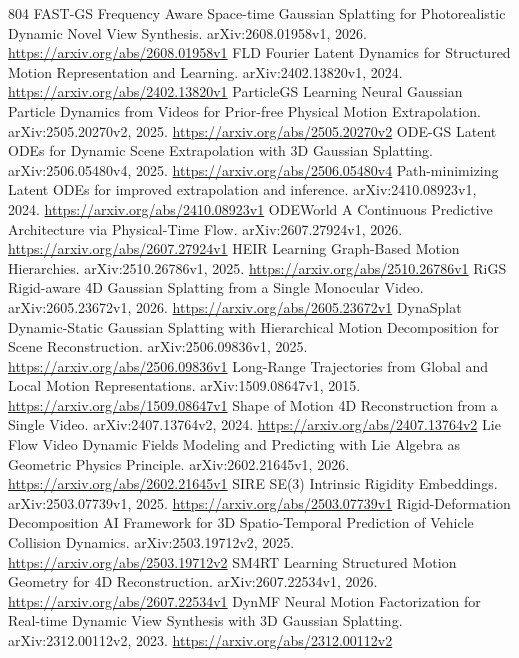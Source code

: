 \documentclass[11pt]{article}
\begin{document}
\begin{thebibliography}{804}
 FAST-GS Frequency Aware Space-time Gaussian Splatting for Photorealistic Dynamic Novel View Synthesis. arXiv:2608.01958v1, 2026. \url{https://arxiv.org/abs/2608.01958v1}
 FLD Fourier Latent Dynamics for Structured Motion Representation and Learning. arXiv:2402.13820v1, 2024. \url{https://arxiv.org/abs/2402.13820v1}
 ParticleGS Learning Neural Gaussian Particle Dynamics from Videos for Prior-free Physical Motion Extrapolation. arXiv:2505.20270v2, 2025. \url{https://arxiv.org/abs/2505.20270v2}
 ODE-GS Latent ODEs for Dynamic Scene Extrapolation with 3D Gaussian Splatting. arXiv:2506.05480v4, 2025. \url{https://arxiv.org/abs/2506.05480v4}
 Path-minimizing Latent ODEs for improved extrapolation and inference. arXiv:2410.08923v1, 2024. \url{https://arxiv.org/abs/2410.08923v1}
 ODEWorld A Continuous Predictive Architecture via Physical-Time Flow. arXiv:2607.27924v1, 2026. \url{https://arxiv.org/abs/2607.27924v1}
 HEIR Learning Graph-Based Motion Hierarchies. arXiv:2510.26786v1, 2025. \url{https://arxiv.org/abs/2510.26786v1}
 RiGS Rigid-aware 4D Gaussian Splatting from a Single Monocular Video. arXiv:2605.23672v1, 2026. \url{https://arxiv.org/abs/2605.23672v1}
 DynaSplat Dynamic-Static Gaussian Splatting with Hierarchical Motion Decomposition for Scene Reconstruction. arXiv:2506.09836v1, 2025. \url{https://arxiv.org/abs/2506.09836v1}
 Long-Range Trajectories from Global and Local Motion Representations. arXiv:1509.08647v1, 2015. \url{https://arxiv.org/abs/1509.08647v1}
 Shape of Motion 4D Reconstruction from a Single Video. arXiv:2407.13764v2, 2024. \url{https://arxiv.org/abs/2407.13764v2}
 Lie Flow Video Dynamic Fields Modeling and Predicting with Lie Algebra as Geometric Physics Principle. arXiv:2602.21645v1, 2026. \url{https://arxiv.org/abs/2602.21645v1}
 SIRE SE(3) Intrinsic Rigidity Embeddings. arXiv:2503.07739v1, 2025. \url{https://arxiv.org/abs/2503.07739v1}
 Rigid-Deformation Decomposition AI Framework for 3D Spatio-Temporal Prediction of Vehicle Collision Dynamics. arXiv:2503.19712v2, 2025. \url{https://arxiv.org/abs/2503.19712v2}
 SM4RT Learning Structured Motion Geometry for 4D Reconstruction. arXiv:2607.22534v1, 2026. \url{https://arxiv.org/abs/2607.22534v1}
 DynMF Neural Motion Factorization for Real-time Dynamic View Synthesis with 3D Gaussian Splatting. arXiv:2312.00112v2, 2023. \url{https://arxiv.org/abs/2312.00112v2}

\end{thebibliography}
\end{document}
